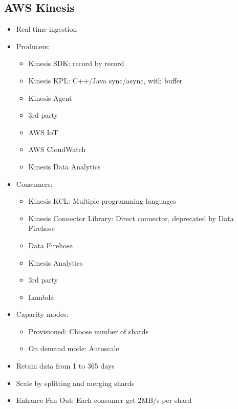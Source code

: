 \documentclass[../../main.tex]{subfiles}
\begin{document}
\subsection{AWS Kinesis}
\begin{itemize}
    \item Real time ingestion
    \item Producers:
    \begin{itemize}
        \item Kinesis SDK: record by record
        \item Kinesis KPL: C++/Java sync/async, with buffer
        \item Kinesis Agent
        \item 3rd party
        \item AWS IoT
        \item AWS CloudWatch
        \item Kinesis Data Analytics
    \end{itemize}
    \item Consumers:
    \begin{itemize}
        \item Kinesis KCL: Multiple programming languages
        \item Kinesis Connector Library: Direct connector, deprecated by Data Firehose
        \item Data Firehose
        \item Kinesis Analytics
        \item 3rd party
        \item Lambda
    \end{itemize}
    \item Capacity modes:
    \begin{itemize}
        \item Provisioned: Choose number of shards
        \item On demand mode: Autoscale
    \end{itemize}
    \item Retain data from 1 to 365 days
    \item Scale by splitting and merging shards
    \item Enhance Fan Out: Each consumer get 2MB/s per shard
\end{itemize}
\end{document}
